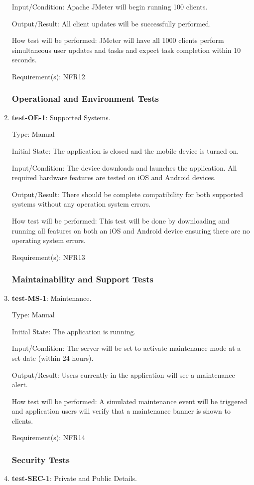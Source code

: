 \documentclass[12pt, titlepage]{article}
\begin{document}
\begin{enumerate}
		Input/Condition: Apache JMeter will begin running 100 clients.
		
		Output/Result: All client updates will be successfully performed.
		
		How test will be performed: JMeter will have all 1000 clients perform simultaneous user updates and tasks and expect task completion within 10 seconds.
		
		Requirement(s): NFR12
	\subsubsection{Operational and Environment Tests}
		\item{\textbf{test-OE-1}}: Supported Systems.
		
		Type: Manual
		
		Initial State: The application is closed and the mobile device is turned on.
		
		Input/Condition: The device downloads and launches the application. All required hardware features are tested on iOS and Android devices.
		
		Output/Result: There should be complete compatibility for both supported systems without any operation system errors. 
		
		How test will be performed: This test will be done by downloading and running all features on both an iOS and Android device ensuring there are no operating system errors.
		
		Requirement(s): NFR13
	\subsubsection{Maintainability and Support Tests}
		\item{\textbf{test-MS-1}}: Maintenance.
		
		Type: Manual
		
		Initial State: The application is running. 
		
		Input/Condition: The server will be set to activate maintenance mode at a set date (within 24 hours).
		
		Output/Result: Users currently in the application will see a maintenance alert.
		
		How test will be performed: A simulated maintenance event will be triggered and application users will verify that a maintenance banner is shown to clients.
		
		Requirement(s): NFR14
	\subsubsection{Security Tests}
		\item{\textbf{test-SEC-1}}: Private and Public Details.
		

\end{enumerate}
\end{document}
